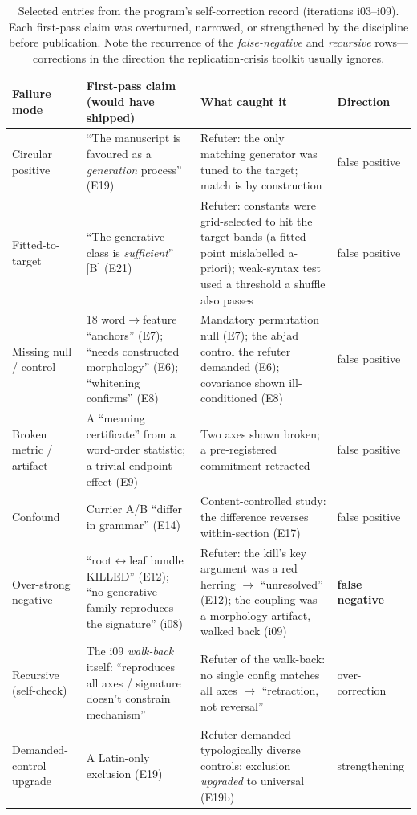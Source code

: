 \documentclass[11pt]{article}
\begin{document}
\begin{table}[t]\centering\small
\renewcommand{\arraystretch}{1.25}
\begin{tabular}{@{}p{2.55cm}p{4.4cm}p{4.1cm}p{2.3cm}@{}}
\toprule
\textbf{Failure mode} & \textbf{First-pass claim (would have shipped)} &
\textbf{What caught it} & \textbf{Direction} \\
\midrule
Circular positive & ``The manuscript is favoured as a \emph{generation} process'' (E19) &
Refuter: the only matching generator was tuned to the target; match is by construction &
false positive \\
Fitted-to-target & ``The generative class is \emph{sufficient}'' [B] (E21) &
Refuter: constants were grid-selected to hit the target bands (a fitted point mislabelled
a-priori); weak-syntax test used a threshold a shuffle also passes & false positive \\
Missing null / control & 18 word$\rightarrow$feature ``anchors'' (E7); ``needs constructed
morphology'' (E6); ``whitening confirms'' (E8) & Mandatory permutation null (E7); the
abjad control the refuter demanded (E6); covariance shown ill-conditioned (E8) &
false positive \\
Broken metric / artifact & A ``meaning certificate'' from a word-order statistic; a
trivial-endpoint effect (E9) & Two axes shown broken; a pre-registered commitment
retracted & false positive \\
Confound & Currier A/B ``differ in grammar'' (E14) & Content-controlled study: the
difference reverses within-section (E17) & false positive \\
Over-strong negative & ``root$\leftrightarrow$leaf bundle KILLED'' (E12); ``no generative
family reproduces the signature'' (i08) & Refuter: the kill's key argument was a red
herring $\rightarrow$ ``unresolved'' (E12); the coupling was a morphology artifact, walked
back (i09) & \textbf{false negative} \\
Recursive (self-check) & The i09 \emph{walk-back} itself: ``reproduces all axes / signature
doesn't constrain mechanism'' & Refuter of the walk-back: no single config matches all axes
$\rightarrow$ ``retraction, not reversal'' & over-correction \\
Demanded-control upgrade & A Latin-only exclusion (E19) & Refuter demanded typologically
diverse controls; exclusion \emph{upgraded} to universal (E19b) & strengthening \\
\bottomrule
\end{tabular}
\caption{Selected entries from the program's self-correction record (iterations i03--i09).
Each first-pass claim was overturned, narrowed, or strengthened by the discipline before
publication. Note the recurrence of the \emph{false-negative} and \emph{recursive} rows---
corrections in the direction the replication-crisis toolkit usually ignores.}
\label{tab:record}
\end{table}
\end{document}

